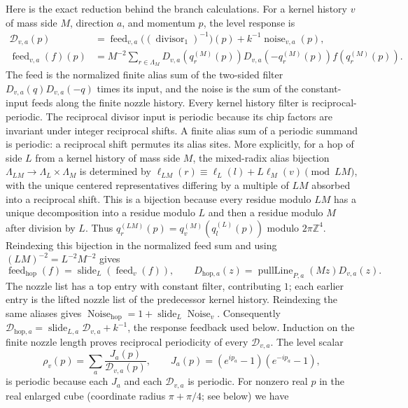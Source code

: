 Here is the exact reduction behind the branch calculations. For a kernel history $v$
of mass side $M$, direction $a$, and momentum $p$, the level response is
\begin{align*}
 \mathscr D_{v,a}(p)&=\operatorname{feed}_{v,a}
       \bigl((\operatorname{divisor}_1)^{-1}\bigr)(p)
       +k^{-1}\operatorname{noise}_{v,a}(p),\\
 \operatorname{feed}_{v,a}(f)(p)&=M^{-2}\sum_{r\in\Lambda_M}
    D_{v,a}(q_r^{(M)}(p))D_{v,a}(-q_r^{(M)}(p))f(q_r^{(M)}(p)).
\end{align*}
The feed is the normalized finite alias sum of the two-sided filter
$D_{v,a}(q)D_{v,a}(-q)$ times its input, and the noise is the sum of the
constant-input feeds along the finite nozzle history. Every kernel history filter is
reciprocal-periodic. The reciprocal divisor input is periodic because its
chip factors are invariant under integer reciprocal shifts. A finite alias
sum of a periodic summand is periodic: a reciprocal shift permutes its alias
sites. More explicitly, for a hop of side $L$ from a kernel history of mass side $M$,
the mixed-radix alias bijection $\Lambda_{LM}\to\Lambda_L\times\Lambda_M$
is determined by
$\ell_{LM}(r)\equiv\ell_L(l)+L\ell_M(v)\pmod{LM}$, with the unique
centered representatives differing by a multiple of $LM$ absorbed into a
reciprocal shift. This is a bijection because every residue modulo $LM$ has
a unique decomposition into a residue modulo $L$ and then a residue modulo
$M$ after division by $L$. Thus
$q_r^{(LM)}(p)=q_v^{(M)}(q_l^{(L)}(p))$ modulo $2\pi\mathbb Z^4$.
Reindexing this bijection in the normalized feed sum and using
$(LM)^{-2}=L^{-2}M^{-2}$ gives
\[
 \operatorname{feed}_{\mathrm{hop}}(f)
   =\operatorname{slide}_{L}(\operatorname{feed}_{v}(f)),\qquad
 D_{\mathrm{hop},a}(z)=\operatorname{pullLine}_{P,a}(Mz)D_{v,a}(z).
\]
The nozzle list has a top entry with constant filter, contributing $1$;
each earlier entry is the lifted nozzle list of the predecessor kernel history.
Reindexing the same aliases gives
$\operatorname{Noise}_{\mathrm{hop}}=1+\operatorname{slide}_{L}
\operatorname{Noise}_{v}$. Consequently
$\mathscr D_{\mathrm{hop},a}=\operatorname{slide}_{L,a}
\mathscr D_{v,a}+k^{-1}$, the response feedback used below. Induction on
the finite nozzle length proves reciprocal periodicity of every
$\mathscr D_{v,a}$.
The level scalar
\[
 \rho_v(p)=\sum_a\frac{J_a(p)}{\mathscr D_{v,a}(p)},\qquad
 J_a(p)=(e^{ip_a}-1)(e^{-ip_a}-1),
\]
is periodic because each $J_a$ and each $\mathscr D_{v,a}$ is periodic.
For nonzero real $p$ in the real enlarged cube (coordinate radius $\pi+\pi/4$; see below) we have
